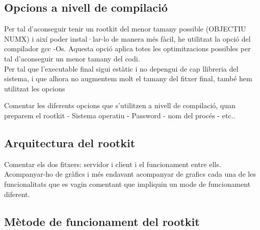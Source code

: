 \subsection{Opcions a nivell de compilació}
Per tal d'aconseguir tenir un rootkit del menor tamany possible (OBJECTIU NUMX) i així poder instal·lar-lo de manera més fàcil, he utilitzat la opció del compilador gcc -Os. Aquesta opció aplica totes les optimitzacions possibles per tal d'aconseguir un menor tamany del codi. \\

Per tal que l'executable final sigui estàtic i no depengui de cap llibreria del sistema, i que alhora no augmentem molt el tamany del fitxer final, també hem utilitzat les opcions 

Comentar les diferents opcions que s'utilitzen a nivell de compilació, quan preparem el rootkit
- Sistema operatiu
- Password
- nom del procés
- etc..

\subsection{Arquitectura del rootkit}
Comentar els dos fitxers: servidor i client i el funcionament entre ells. Acompanyar-ho de gràfics i més endavant acompanyar de grafics
cada una de les funcionalitats que es vagin comentant que impliquin un mode de funcionament diferent.

\subsection{Mètode de funcionament del rootkit}

